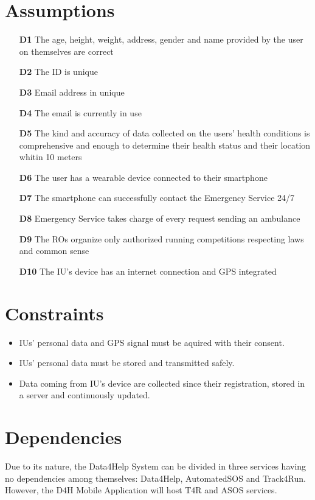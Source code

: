 \section{Assumptions}
\begin{itemize}
\item	[\textbf{D1}] The age, height, weight, address, gender and name provided by the user on themselves are correct
\item	[\textbf{D2}] The ID is unique
\item	[\textbf{D3}] Email address in unique
\item	[\textbf{D4}] The email is currently in use
\item	[\textbf{D5}] The kind and accuracy of data collected on the users’ health conditions is comprehensive and enough to determine their health status and their location whitin 10 meters
\item	[\textbf{D6}] The user has a wearable device connected to their smartphone
\item	[\textbf{D7}] The smartphone can successfully contact the Emergency Service 24/7
\item	[\textbf{D8}] Emergency Service takes charge of every request sending an ambulance
\item	[\textbf{D9}] The ROs organize only authorized running competitions respecting laws and common sense
\item [\textbf{D10}] The IU's device has an internet connection and GPS integrated
\end{itemize}

\section{Constraints}
\begin{itemize}
\item IUs' personal data and GPS signal must be aquired with their consent.
\item IUs' personal data must be stored and transmitted safely. 
\item Data coming from IU’s device are collected since their registration, stored in a server and continuously updated.
\end{itemize}
\section{Dependencies}
Due to its nature, the Data4Help System can be divided in three services having no dependencies among themselves: Data4Help, AutomatedSOS and Track4Run. However, the D4H Mobile Application will host T4R and ASOS services.
